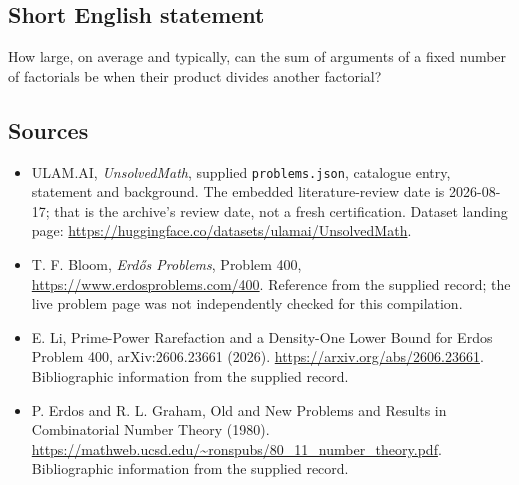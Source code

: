 \documentclass[11pt,a4paper]{article}
\begin{document}
\subsection{Short English statement}

How large, on average and typically, can the sum of arguments of a fixed number of factorials be when their product divides another factorial?

\subsection{Sources}

{\small

\begin{itemize}

\item[\hypertarget{source:statement:1}{S1}] ULAM.AI, \emph{UnsolvedMath}, supplied \texttt{problems.json}, catalogue entry, statement and background. The embedded literature-review date is 2026-08-17; that is the archive’s review date, not a fresh certification. Dataset landing page: \url{https://huggingface.co/datasets/ulamai/UnsolvedMath}.

\item[\hypertarget{source:statement:2}{S2}] T. F. Bloom, \emph{Erdős Problems}, Problem 400, \url{https://www.erdosproblems.com/400}. Reference from the supplied record; the live problem page was not independently checked for this compilation.

\item[\hypertarget{source:statement:3}{S3}] E. Li, Prime-Power Rarefaction and a Density-One Lower Bound for Erdos Problem 400, arXiv:2606.23661 (2026). \url{https://arxiv.org/abs/2606.23661}. Bibliographic information from the supplied record.

\item[\hypertarget{source:statement:4}{S4}] P. Erdos and R. L. Graham, Old and New Problems and Results in Combinatorial Number Theory (1980). \url{https://mathweb.ucsd.edu/~ronspubs/80_11_number_theory.pdf}. Bibliographic information from the supplied record.

\end{itemize}

}

\label{end:statement}
\end{document}
